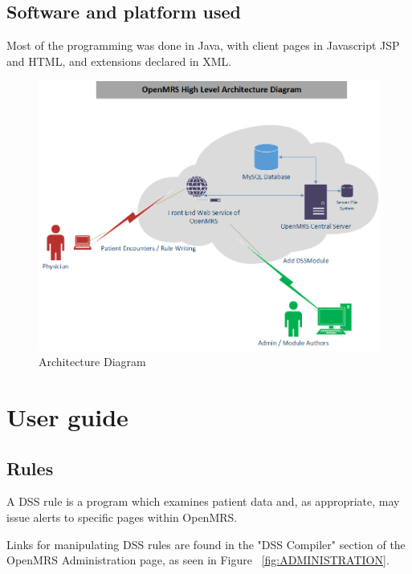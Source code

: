 \documentclass[12pt,letterpaper]{article}
\begin{document}
\subsection{Software and platform used}

Most of the programming was done in Java, with client pages in Javascript JSP and HTML, and extensions declared in XML.

\begin{figure}\begin{center}
\includegraphics[width=6.5in]{OpenMRS_Architecture.png}
\end{center}
\caption{Architecture Diagram} \label{fig:ARCHITECTURE}
\end{figure}


\newpage 
\section{User guide}

\subsection{Rules}

A DSS rule is a program which examines patient data and, as 
appropriate, may issue alerts to specific pages within OpenMRS.

Links for manipulating DSS rules are found in the "DSS Compiler" 
section of the OpenMRS Administration page, as seen in Figure 
~\ref{fig:ADMINISTRATION}.
\end{document}
